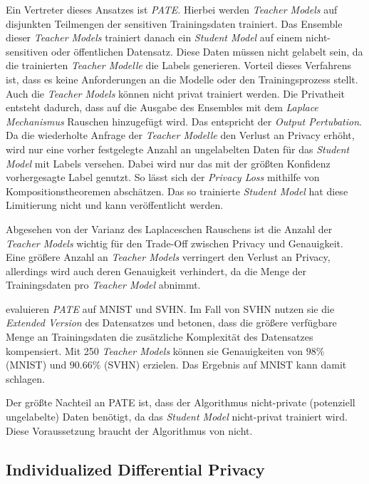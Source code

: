 Ein Vertreter dieses Ansatzes ist \textit{PATE}\cite{papernot:2017}. Hierbei werden \textit{Teacher Models} auf disjunkten Teilmengen der sensitiven Trainingsdaten trainiert. Das Ensemble dieser \textit{Teacher Models} trainiert danach ein \textit{Student Model} auf einem nicht-sensitiven oder öffentlichen Datensatz. Diese Daten müssen nicht gelabelt sein, da die trainierten \textit{Teacher Modelle} die Labels generieren. Vorteil dieses Verfahrens ist, dass es keine Anforderungen an die Modelle oder den Trainingsprozess stellt. Auch die \textit{Teacher Models} können nicht privat trainiert werden. Die Privatheit entsteht dadurch, dass auf die Ausgabe des Ensembles mit dem \textit{Laplace Mechanismus} Rauschen hinzugefügt wird. Das entspricht der \textit{Output Pertubation}. Da die wiederholte Anfrage der \textit{Teacher Modelle} den Verlust an Privacy erhöht, wird nur eine vorher festgelegte Anzahl an ungelabelten Daten für das \textit{Student Model} mit Labels versehen. Dabei wird nur das mit der größten Konfidenz vorhergesagte Label genutzt. So lässt sich der \textit{Privacy Loss} mithilfe von Kompositionstheoremen abschätzen. Das so trainierte \textit{Student Model} hat diese Limitierung nicht und kann veröffentlicht werden.

Abgesehen von der Varianz des Laplaceschen Rauschens ist die Anzahl der \textit{Teacher Models} wichtig für den Trade-Off zwischen Privacy und Genauigkeit. Eine größere Anzahl an \textit{Teacher Models} verringert den Verlust an Privacy, allerdings wird auch deren Genauigkeit verhindert, da die Menge der Trainingsdaten pro \textit{Teacher Model} abnimmt.

\textcite{papernot:2017} evaluieren \textit{PATE} auf MNIST und SVHN. Im Fall von SVHN nutzen sie die \textit{Extended Version} des Datensatzes und betonen, dass die größere verfügbare Menge an Trainingsdaten die zusätzliche Komplexität des Datensatzes kompensiert. Mit 250 \textit{Teacher Models} können sie Genauigkeiten von $98\%$ (MNIST) und $90.66\%$ (SVHN) erzielen. Das Ergebnis auf MNIST kann damit \textcite{abadi:2016} schlagen.

Der größte Nachteil an PATE ist, dass der Algorithmus nicht-private (potenziell ungelabelte) Daten benötigt, da das \textit{Student Model} nicht-privat trainiert wird. Diese Voraussetzung braucht der Algorithmus von \textcite{abadi:2016} nicht.

\subsection{Individualized Differential Privacy}

